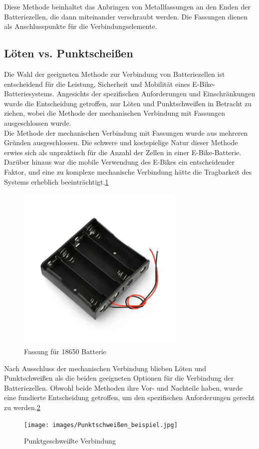 Diese Methode beinhaltet das Anbringen von Metallfassungen an den Enden der Batteriezellen, die dann miteinander verschraubt werden. Die Fassungen dienen als Anschlusspunkte für die Verbindungselemente.\\

\subsection{Löten vs. Punktscheißen}
Die Wahl der geeigneten Methode zur Verbindung von Batteriezellen ist entscheidend für die Leistung, Sicherheit und Mobilität eines E-Bike-Batteriesystems. Angesichts der spezifischen Anforderungen und Einschränkungen wurde die Entscheidung getroffen, nur Löten und Punktschweißen in Betracht zu ziehen, wobei die Methode der mechanischen Verbindung mit Fassungen ausgeschlossen wurde.\\

Die Methode der mechanischen Verbindung mit Fassungen wurde aus mehreren Gründen ausgeschlossen. Die schwere und kostspielige Natur dieser Methode erwies sich als unpraktisch für die Anzahl der Zellen in einer E-Bike-Batterie. Darüber hinaus war die mobile Verwendung des E-Bikes ein entscheidender Faktor, und eine zu komplexe mechanische Verbindung hätte die Tragbarkeit des Systems erheblich beeinträchtigt.\ref{fig:2}\\
\begin{figure}[h]
    \centering
    \includegraphics[width=8cm]{images/korb-fur-4-18650-akkus-reihenschaltung.png}
    \caption{Fassung für 18650 Batterie\cite{.02.03.2024}}%
    \label{fig:2}
\end{figure}


Nach Ausschluss der mechanischen Verbindung blieben Löten und Punktschweißen als die beiden geeigneten Optionen für die Verbindung der Batteriezellen. Obwohl beide Methoden ihre Vor- und Nachteile haben, wurde eine fundierte Entscheidung getroffen, um den spezifischen Anforderungen gerecht zu werden.\ref{fig:3}\\
\begin{figure}[ht]
    \centering
    \texttt{[image: images/Punktschweißen\_beispiel.jpg]}
    \caption{Punktgeschweißte Verbindung\cite{LorenzScherrer.02.03.2024}}%
    \label{fig:3}
\end{figure}

